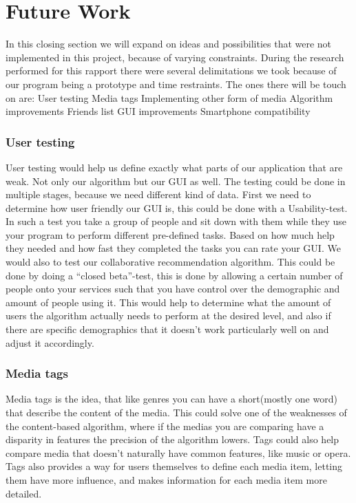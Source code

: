 \section{Future Work}
\label{conclusion:FutureWork}

In this closing section we will expand on ideas and possibilities that were not implemented in this project, because of varying constraints. During the research performed for this rapport there were several delimitations we took because of our program being a prototype and time restraints. The ones there will be touch on are:
User testing
Media tags
Implementing other form of media
Algorithm improvements
Friends list
GUI improvements
Smartphone compatibility 

\subsubsection{User testing}
User testing would help us define exactly what parts of our application that are weak. Not only our algorithm but our GUI as well. The testing could be done in multiple stages, because we need different kind of data. First we need to determine how user friendly our GUI is, this could be done with a Usability-test. In such a test you take a group of people and sit down with them while they use your program to perform different pre-defined tasks. Based on how much help they needed and how fast they completed the tasks you can rate your GUI. We would also to test our collaborative recommendation algorithm. This could be done by doing a “closed beta”-test, this is done by allowing a certain number of people onto your services such that you have control over the demographic and amount of people using it. This would help to determine what the amount of users the algorithm actually needs to perform at the desired level, and also if there are specific demographics that it doesn't work particularly well on and adjust it accordingly.

\subsubsection{Media tags}\label{futureWork:Tags}
Media tags is the idea, that like genres you can have a short(mostly one word) that describe the content of the media. This could solve one of the weaknesses of the content-based algorithm, where if the medias you are comparing have a disparity in features the precision of the algorithm lowers. Tags could also help compare media that doesn't naturally have common features, like music or opera. Tags also provides a way for users themselves to define each media item, letting them have more influence, and makes information for each media item more detailed.

